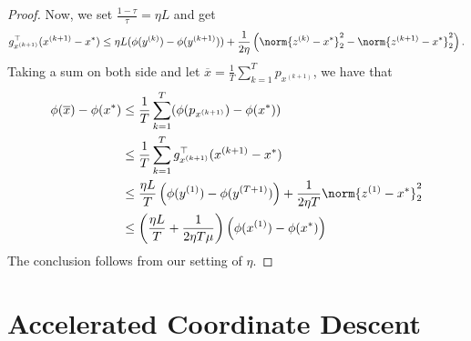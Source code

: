 \begin{proof}
Now, we set $\frac{1-\tau}{\tau}=\eta L$ and get
\[
g_{x^{(k+1)}}^{\top}(x^{(k+1)}-x^{*})\leq\eta L(\phi(y^{(k)})-\phi(y^{(k+1)}))+\frac{1}{2\eta}\left(\norm{z^{(k)}-x^{*}}_{2}^{2}-\norm{z^{(k+1)}-x^{*}}_{2}^{2}\right).
\]
Taking a sum on both side and let $\overline{x}=\frac{1}{T}\sum_{k=1}^{T}p_{x^{(k+1)}}$,
we have that
\begin{align*}
\phi(\overline{x})-\phi(x^{*}) & \leq\frac{1}{T}\sum_{k=1}^{T}(\phi(p_{x^{(k+1)}})-\phi(x^{*}))\\
 & \leq\frac{1}{T}\sum_{k=1}^{T}g_{x^{(k+1)}}^{\top}(x^{(k+1)}-x^{*})\\
 & \leq\frac{\eta L}{T}\left(\phi(y^{(1)})-\phi(y^{(T+1)})\right)+\frac{1}{2\eta T}\norm{z^{(1)}-x^{*}}_{2}^{2}\\
 & \leq\left(\frac{\eta L}{T}+\frac{1}{2\eta T\mu}\right)\left(\phi(x^{(1)})-\phi(x^{*})\right)
\end{align*}
The conclusion follows from our setting of $\eta$.
\end{proof}

\section{Accelerated Coordinate Descent}

